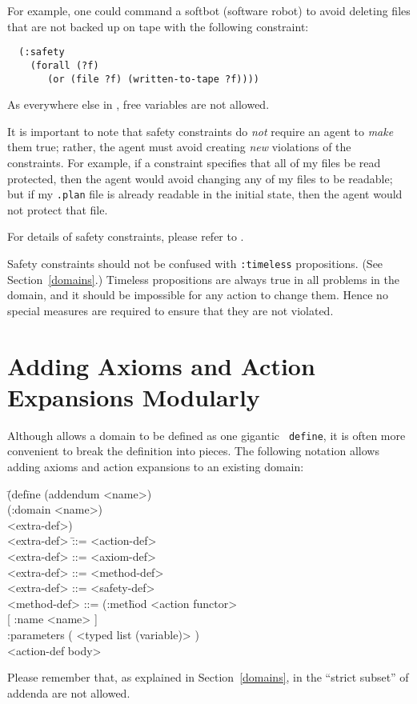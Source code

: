 For example, one could command a softbot (software robot) to avoid deleting
files that are not backed up on tape with the following constraint:

\begin{verbatim}
  (:safety 
    (forall (?f)
       (or (file ?f) (written-to-tape ?f))))
\end{verbatim}

As everywhere else in \lang, free variables are not allowed.

It is important to note that safety constraints do {\em not}
require an agent to {\em make} them true; rather, the agent
must avoid creating {\em new} violations of the constraints.  
For example, if a constraint specifies that all of my files 
be read protected, then the agent would avoid changing any of my files
to be readable; but if my {\tt .plan} file is already readable 
in the initial state, then the agent would not protect that file. 

For details of safety constraints, please refer to
\cite{weld-etzioni-aaai94}.

Safety constraints should not be confused with {\tt :timeless}
propositions.  (See Section~\ref{domains}.)  Timeless propositions
are always true in all problems in the domain, and it should be
impossible for any action to change them.  Hence no special measures
are required to ensure that they are not violated.


\section{Adding Axioms and Action Expansions Modularly}
\label{addenda}

Although \lang{} allows a domain to be defined as one gigantic {\tt
define}, it is often more convenient to break the definition into
pieces.  The following notation allows adding axioms and action
expansions to an existing domain:

\begin{tabtt}
\bump \=(def\=ine (addendum <name>)  \+\+\\
         (:domain <name>)  \\
         <extra-def>\zom) \-\\
   <extra-def> \bump \= ::= <action-def> \\
   <extra-def> \> ::= <axiom-def> \\
   <extra-def> \> ::= <method-def> \\
   <extra-def> \> ::= <safety-def> \\
   <method-def> \> ::= (:met\=hod  <action functor>\+\+\\
			{[} :name <name> ] \\
                        :parameters  ( <typed list (variable)> ) \\
                        <action-def body> \-\-\\
\end{tabtt}
Please remember that, as explained in Section~\ref{domains}, in the
``strict subset'' of \lang{} addenda are not allowed.

